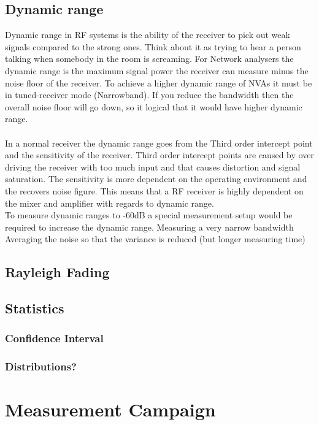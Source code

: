 \section{Dynamic range}
Dynamic range in RF systems is the ability of the receiver to pick out weak signals compared to the strong ones. Think about it as trying to hear a person talking when somebody in the room is screaming. For Network analysers the dynamic range is the maximum signal power the receiver can measure minus the noise floor of the receiver. To achieve a higher dynamic range of NVAs it must be  in tuned-receiver mode (Narrowband). If you reduce the bandwidth then the overall noise floor will go down, so it logical that it would have higher dynamic range. \\\citep{AgilentNVA} \\
In a normal receiver the dynamic range goes from the Third order intercept point and the sensitivity of the receiver. Third order intercept points are caused by over driving the receiver with too much input and that causes distortion and signal saturation. The sensitivity is more dependent on the operating environment and the recovers noise figure. \citep{understandDynamic} This means that a RF receiver is highly dependent on the mixer and amplifier with regards to dynamic range.\\
To measure dynamic ranges to -60dB a special measurement setup would be required to increase the dynamic range.
Measuring a very narrow bandwidth
Averaging the noise so that the variance is reduced (but longer measuring time)


\section{Rayleigh Fading}
\section{Statistics}
\subsection{Confidence Interval}
\subsection{Distributions?}

\chapter{Measurement Campaign}
